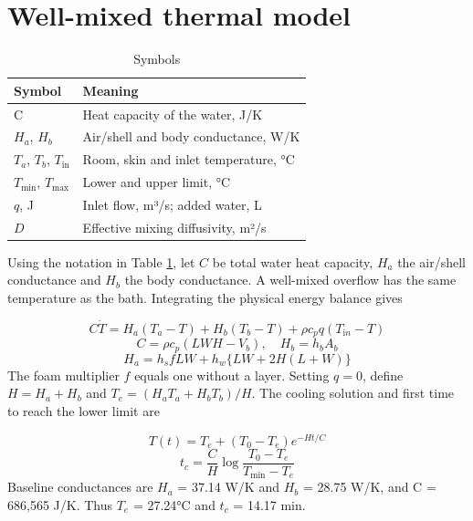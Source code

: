 \documentclass[12pt,a4paper]{article}
\begin{document}
\section{Well-mixed thermal model}
\begin{table}[ht]\centering\normalsize\caption{Symbols}\label{tab:5}
\begin{tabular}{@{}>{\raggedright\arraybackslash}p{0.2350\dimexpr\linewidth-2\tabcolsep\relax}>{\raggedright\arraybackslash}p{0.7650\dimexpr\linewidth-2\tabcolsep\relax}@{}}
\toprule
Symbol & Meaning \\ \midrule
C & Heat capacity of the water, J/K \\
$H_a$, $H_b$ & Air/shell and body conductance, W/K \\
$T_a$, $T_b$, $T_{\mathrm{in}}$ & Room, skin and inlet temperature, °C \\
$T_{\min}$, $T_{\max}$ & Lower and upper limit, °C \\
$q$, J & Inlet flow, m³/s; added water, L \\
$D$ & Effective mixing diffusivity, m²/s \\ \bottomrule
\end{tabular}
\end{table}
Using the notation in Table \ref{tab:5}, let $C$ be total water heat capacity, $H_a$ the air/shell conductance and $H_b$ the body conductance. A well-mixed overflow has the same temperature as the bath. Integrating the physical energy balance gives

\begin{equation}C\dot T=H_a(T_a-T)+H_b(T_b-T)+\rho c_pq(T_{\mathrm in}-T)\end{equation}
\begin{equation}C=\rho c_p(LWH-V_b),\quad H_b=h_bA_b\end{equation}
\begin{equation}H_a=h_s fLW+h_w\{LW+2H(L+W)\}\end{equation}
The foam multiplier $f$ equals one without a layer. Setting $q=0$, define $H=H_a+H_b$ and $T_e=(H_aT_a+H_bT_b)/H$. The cooling solution and first time to reach the lower limit are

\begin{equation}T(t)=T_e+(T_0-T_e)e^{-Ht/C}\end{equation}
\begin{equation}t_c=\frac{C}{H}\log\frac{T_0-T_e}{T_{\min}-T_e}\end{equation}
Baseline conductances are $H_a$ = 37.14 W/K and $H_b$ = 28.75 W/K, and C = 686,565 J/K. Thus $T_e$ = 27.24°C and $t_c$ = 14.17 min.
\end{document}
